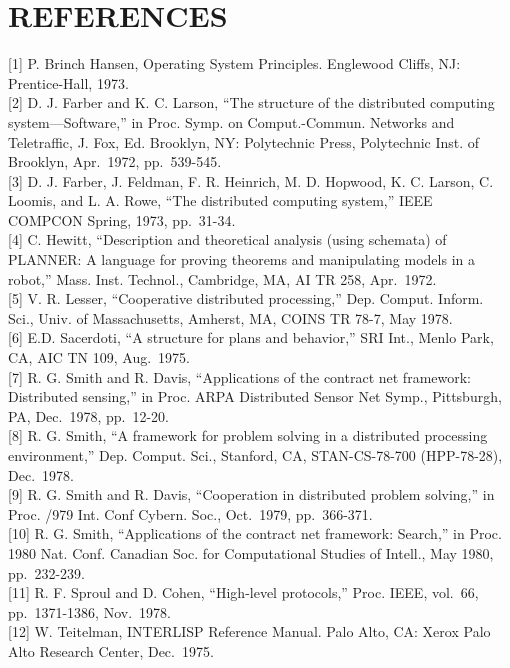 \documentclass[
]{article}
\begin{document}
\section{REFERENCES}\label{references}

{[}1{]} P. Brinch Hansen, Operating System Principles. Englewood Cliffs,
NJ: Prentice-Hall, 1973.\\
{[}2{]} D. J. Farber and K. C. Larson, ``The structure of the
distributed computing system---Software,'' in Proc. Symp. on
Comput.-Commun. Networks and Teletraffic, J. Fox, Ed. Brooklyn, NY:
Polytechnic Press, Polytechnic Inst. of Brooklyn, Apr.~1972,
pp.~539-545.\\
{[}3{]} D. J. Farber, J. Feldman, F. R. Heinrich, M. D. Hopwood, K. C.
Larson, C. Loomis, and L. A. Rowe, ``The distributed computing system,''
IEEE COMPCON Spring, 1973, pp.~31-34.\\
{[}4{]} C. Hewitt, ``Description and theoretical analysis (using
schemata) of PLANNER: A language for proving theorems and manipulating
models in a robot,'' Mass. Inst. Technol., Cambridge, MA, AI TR 258,
Apr.~1972.\\
{[}5{]} V. R. Lesser, ``Cooperative distributed processing,'' Dep.
Comput. Inform. Sci., Univ. of Massachusetts, Amherst, MA, COINS TR
78-7, May 1978.\\
{[}6{]} E.D. Sacerdoti, ``A structure for plans and behavior,'' SRI
Int., Menlo Park, CA, AIC TN 109, Aug.~1975.\\
{[}7{]} R. G. Smith and R. Davis, ``Applications of the contract net
framework: Distributed sensing,'' in Proc. ARPA Distributed Sensor Net
Symp., Pittsburgh, PA, Dec.~1978, pp.~12-20.\\
{[}8{]} R. G. Smith, ``A framework for problem solving in a distributed
processing environment,'' Dep. Comput. Sci., Stanford, CA,
STAN-CS-78-700 (HPP-78-28), Dec.~1978.\\
{[}9{]} R. G. Smith and R. Davis, ``Cooperation in distributed problem
solving,'' in Proc. /979 Int. Conf Cybern. Soc., Oct.~1979,
pp.~366-371.\\
{[}10{]} R. G. Smith, ``Applications of the contract net framework:
Search,'' in Proc. 1980 Nat. Conf. Canadian Soc. for Computational
Studies of Intell., May 1980, pp.~232-239.\\
{[}11{]} R. F. Sproul and D. Cohen, ``High-level protocols,'' Proc.
IEEE, vol.~66, pp.~1371-1386, Nov.~1978.\\
{[}12{]} W. Teitelman, INTERLISP Reference Manual. Palo Alto, CA: Xerox
Palo Alto Research Center, Dec.~1975.
\end{document}
